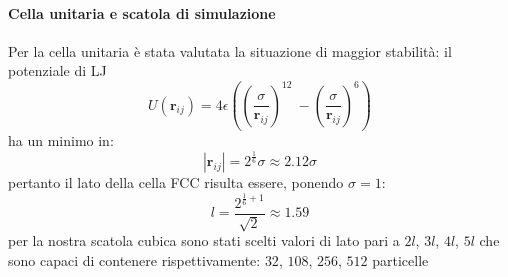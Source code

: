 \documentclass[a4paper,11pt]{article}
\begin{document}
		\paragraph{Cella unitaria e scatola di simulazione\\} %
		\label{par:cella_unitaria_e_scatola_di_simulazione}
			Per la cella unitaria è stata valutata la situazione di maggior 
			stabilità: il potenziale di LJ
			\begin{equation}
				U(\mathbf{r}_{ij})= 4 \epsilon \left(\left(\frac{\sigma}{\mathbf{r}_{ij}}\right)^{12}\
				-\left(\frac{\sigma}{\mathbf{r}_{ij}}\right)^6\right)
			\end{equation}
			ha un minimo in:
			\begin{equation}
				\left|\mathbf{r}_{ij}\right| = 2^{\frac{1}{6}} \sigma
				\approx 2.12 \sigma
			\end{equation}
			pertanto il lato della cella FCC risulta essere, ponendo $\sigma = 1$:
			\begin{equation}
				l = \frac{2^{\frac{1}{6}+1}}{\sqrt{2}} \approx 1.59
			\end{equation}
			per la nostra scatola cubica sono stati scelti valori di lato pari a 
			$2l$, $3l$, $4l$, $5l$ che sono capaci di contenere rispettivamente: 
			$32$, $108$, $256$, $512$ particelle
\end{document}
